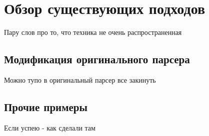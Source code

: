 \section{Обзор существующих подходов}
Пару слов про то, что техника не очень распространенная

\subsection{Модификация оригинального парсера}
Можно тупо в оригинальный парсер все закинуть

\subsection{Прочие примеры}
Если успею - как сделали там

\pagebreak
